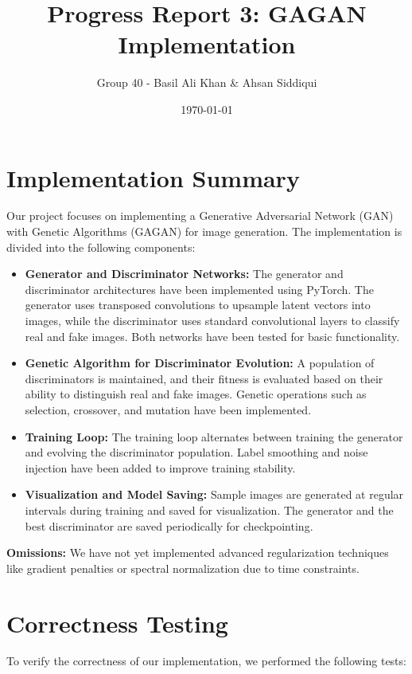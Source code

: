 \documentclass[12pt]{article}
\title{Progress Report 3: GAGAN Implementation}
\author{Group 40 - Basil Ali Khan \& Ahsan Siddiqui}
\date{\today}
\begin{document}
\maketitle

\section*{Implementation Summary}
Our project focuses on implementing a Generative Adversarial Network (GAN) with Genetic Algorithms (GAGAN) for image generation. The implementation is divided into the following components:

\begin{itemize}
    \item \textbf{Generator and Discriminator Networks:}  
    The generator and discriminator architectures have been implemented using PyTorch. The generator uses transposed convolutions to upsample latent vectors into images, while the discriminator uses standard convolutional layers to classify real and fake images. Both networks have been tested for basic functionality.

    \item \textbf{Genetic Algorithm for Discriminator Evolution:}  
    A population of discriminators is maintained, and their fitness is evaluated based on their ability to distinguish real and fake images. Genetic operations such as selection, crossover, and mutation have been implemented.

    \item \textbf{Training Loop:}  
    The training loop alternates between training the generator and evolving the discriminator population. Label smoothing and noise injection have been added to improve training stability.

    \item \textbf{Visualization and Model Saving:}  
    Sample images are generated at regular intervals during training and saved for visualization. The generator and the best discriminator are saved periodically for checkpointing.
\end{itemize}

\textbf{Omissions:}  
We have not yet implemented advanced regularization techniques like gradient penalties or spectral normalization due to time constraints.

\section*{Correctness Testing}
To verify the correctness of our implementation, we performed the following tests:
\end{document}
